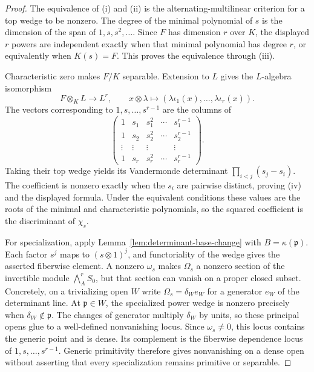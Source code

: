 \documentclass[11pt]{article}
\theoremstyle{definition}
\theoremstyle{remark}
\begin{document}
\begin{proof}
The equivalence of (i) and (ii) is the alternating-multilinear criterion for
a top wedge to be nonzero.  The degree of the minimal polynomial of $s$ is
the dimension of the span of $1,s,s^2,\ldots$.  Since $F$ has dimension
$r$ over $K$, the displayed $r$ powers are independent exactly when that
minimal polynomial has degree $r$, or equivalently when $K(s)=F$.  This
proves the equivalence through (iii).

Characteristic zero makes $F/K$ separable.  Extension to $L$ gives the
$L$-algebra isomorphism
\[
 F\otimes_KL\longrightarrow L^r,
 \qquad
 x\otimes\lambda\longmapsto
 (\lambda\iota_1(x),\ldots,\lambda\iota_r(x)).
\]
The vectors corresponding to $1,s,\ldots,s^{r-1}$ are the columns of
\[
 \begin{pmatrix}
 1&s_1&s_1^2&\cdots&s_1^{r-1}\\
 1&s_2&s_2^2&\cdots&s_2^{r-1}\\
 \vdots&\vdots&\vdots&&\vdots\\
 1&s_r&s_r^2&\cdots&s_r^{r-1}
 \end{pmatrix}.
\]
Taking their top wedge yields its Vandermonde determinant
$\prod_{i<j}(s_j-s_i)$.  The coefficient is nonzero exactly when the
$s_i$ are pairwise distinct, proving (iv) and the displayed formula.  Under
the equivalent conditions these values are the roots of the minimal and
characteristic polynomials, so the squared coefficient is the discriminant
of $\chi_s$.

For specialization, apply Lemma~\ref{lem:determinant-base-change} with
$B=\kappa(\mathfrak p)$.  Each factor $s^j$ maps to
$(s\otimes1)^j$, and functoriality of the wedge gives the asserted
fiberwise element.  A nonzero $\omega_s$ makes $\Omega_s$ a nonzero section
of the invertible module $\bigwedge_A^rS_0$, but that section can vanish on
a proper closed subset.  Concretely, on a trivializing open $W$ write
$\Omega_s=\delta_W e_W$ for a generator $e_W$ of the determinant line.  At
$\mathfrak p\in W$, the specialized power wedge is nonzero precisely when
$\delta_W\notin\mathfrak p$.  The changes of generator multiply
$\delta_W$ by units, so these principal opens glue to a well-defined
nonvanishing locus.  Since $\omega_s\ne0$, this locus contains the generic
point and is dense.  Its complement is the fiberwise dependence locus of
$1,s,\ldots,s^{r-1}$.  Generic primitivity therefore gives nonvanishing on
a dense open without asserting that every specialization remains primitive
or separable.
\end{proof}
\end{document}
